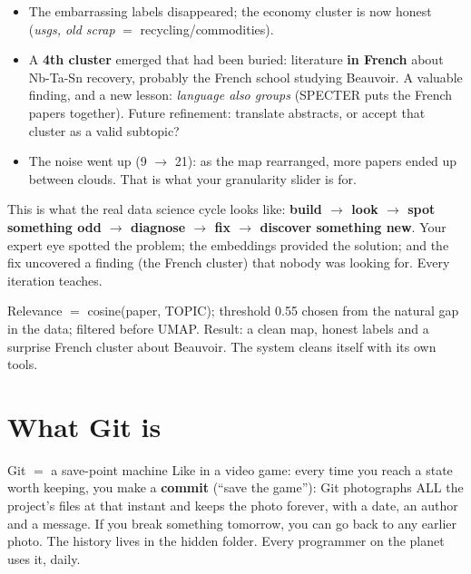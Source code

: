 \documentclass[11pt,a4paper]{article}
\begin{document}
\begin{itemize}
  \item The embarrassing labels disappeared; the economy cluster is now honest
        (\emph{usgs, old scrap} $=$ recycling/commodities).
  \item A \textbf{4th cluster} emerged that had been buried: literature \textbf{in French}
        about Nb-Ta-Sn recovery, probably the French school studying Beauvoir. A valuable
        finding, and a new lesson: \emph{language also groups} (SPECTER puts the French papers
        together). Future refinement: translate abstracts, or accept that cluster as a valid
        subtopic?
  \item The noise went up (9 $\rightarrow$ 21): as the map rearranged, more papers ended up
        between clouds. That is what your granularity slider is for.
\end{itemize}

\begin{ojo}
This is what the real data science cycle looks like: \textbf{build $\rightarrow$ look
$\rightarrow$ spot something odd $\rightarrow$ diagnose $\rightarrow$ fix $\rightarrow$
discover something new}. Your expert eye spotted the problem; the embeddings provided the
solution; and the fix uncovered a finding (the French cluster) that nobody was looking for.
Every iteration teaches.
\end{ojo}

\begin{resumen}
Relevance $=$ cosine(paper, TOPIC); threshold 0.55 chosen from the natural gap in the data;
filtered before UMAP. Result: a clean map, honest labels and a surprise French cluster about
Beauvoir. The system cleans itself with its own tools.
\end{resumen}
\clearpage
{}
{}

\section{What Git is}

\begin{concepto}{Git $=$ a save-point machine}
Like in a video game: every time you reach a state worth keeping, you make a \textbf{commit}
(``save the game''): Git photographs ALL the project's files at that instant and keeps the
photo forever, with a date, an author and a message. If you break something tomorrow, you can
go back to any earlier photo. The history lives in the hidden  folder. Every
programmer on the planet uses it, daily.
\end{concepto}
\end{document}
